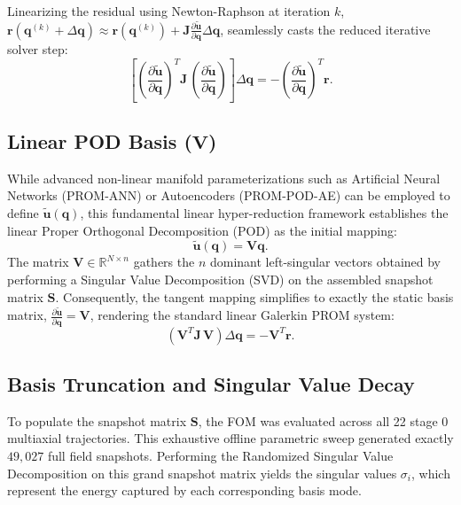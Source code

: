 \documentclass[12pt,a4paper]{article}
\begin{document}
Linearizing the residual using Newton-Raphson at iteration $k$, $\mathbf{r}(\mathbf{q}^{(k)} + \Delta\mathbf{q}) \approx \mathbf{r}(\mathbf{q}^{(k)}) + \mathbf{J} \frac{\partial \widetilde{\mathbf{u}}}{\partial \mathbf{q}} \Delta\mathbf{q}$, seamlessly casts the reduced iterative solver step:
\begin{equation}
    \left[ \left( \frac{\partial \widetilde{\mathbf{u}}}{\partial \mathbf{q}} \right)^T \mathbf{J}\, \left( \frac{\partial \widetilde{\mathbf{u}}}{\partial \mathbf{q}} \right) \right] \Delta\mathbf{q} = - \left( \frac{\partial \widetilde{\mathbf{u}}}{\partial \mathbf{q}} \right)^T \mathbf{r}.
\end{equation}

\subsection{Linear POD Basis ($\mathbf{V}$)}

While advanced non-linear manifold parameterizations such as Artificial Neural Networks (PROM-ANN) or Autoencoders (PROM-POD-AE) can be employed to define $\widetilde{\mathbf{u}}(\mathbf{q})$, this fundamental linear hyper-reduction framework establishes the linear Proper Orthogonal Decomposition (POD) as the initial mapping:
\begin{equation}
    \widetilde{\mathbf{u}}(\mathbf{q}) = \mathbf{V}\mathbf{q}.
\end{equation}
The matrix $\mathbf{V} \in \mathbb{R}^{N \times n}$ gathers the $n$ dominant left-singular vectors obtained by performing a Singular Value Decomposition (SVD) on the assembled snapshot matrix $\mathbf{S}$. Consequently, the tangent mapping simplifies to exactly the static basis matrix, $\frac{\partial \widetilde{\mathbf{u}}}{\partial \mathbf{q}} = \mathbf{V}$, rendering the standard linear Galerkin PROM system:
\begin{equation}
    \left( \mathbf{V}^T \mathbf{J}\, \mathbf{V} \right) \Delta\mathbf{q} = - \mathbf{V}^T \mathbf{r}.
\end{equation}

\subsection{Basis Truncation and Singular Value Decay}

To populate the snapshot matrix $\mathbf{S}$, the FOM was evaluated across all 22 stage 0 multiaxial trajectories. This exhaustive offline parametric sweep generated exactly $49,027$ full field snapshots. Performing the Randomized Singular Value Decomposition on this grand snapshot matrix yields the singular values $\sigma_i$, which represent the energy captured by each corresponding basis mode.
\end{document}

